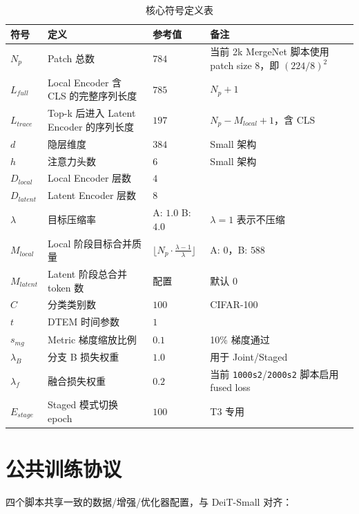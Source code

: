 \documentclass[a4paper,11pt]{article}
\begin{document}
\begin{table}[h]
\centering
\caption{核心符号定义表}
\begin{tabular}{l l l l}
\toprule
\textbf{符号} & \textbf{定义} & \textbf{参考值} & \textbf{备注} \\
\midrule
$N_p$ & Patch 总数 & $784$ & 当前 2k MergeNet 脚本使用 patch size $8$，即 $(224/8)^2$ \\
$L_{full}$ & Local Encoder 含 CLS 的完整序列长度 & $785$ & $N_p + 1$ \\
$L_{trace}$ & Top-k 后进入 Latent Encoder 的序列长度 & $197$ & $N_p - M_{local} + 1$，含 CLS \\
$d$ & 隐层维度 & $384$ & Small 架构 \\
$h$ & 注意力头数 & $6$ & Small 架构 \\
$D_{local}$ & Local Encoder 层数 & $4$ & \\
$D_{latent}$ & Latent Encoder 层数 & $8$ & \\
$\lambda$ & 目标压缩率 & \makecell[l]{A: $1.0$\\ B: $4.0$} & $\lambda=1$ 表示不压缩 \\
$M_{local}$ & Local 阶段目标合并质量 & $\lfloor N_p \cdot \frac{\lambda-1}{\lambda} \rfloor$ & A: $0$，B: $588$ \\
$M_{latent}$ & Latent 阶段总合并 token 数 & 配置 & 默认 $0$ \\
$C$ & 分类类别数 & $100$ & CIFAR-100 \\
$t$ & DTEM 时间参数 & $1$ & \\
$s_{mg}$ & Metric 梯度缩放比例 & $0.1$ & 10\% 梯度通过 \\
$\lambda_B$ & 分支 B 损失权重 & $1.0$ & 用于 Joint/Staged \\
$\lambda_f$ & 融合损失权重 & $0.2$ & 当前 \texttt{1000s2}/\texttt{2000s2} 脚本启用 fused loss \\
$E_{stage}$ & Staged 模式切换 epoch & $100$ & T3 专用 \\
\bottomrule
\end{tabular}
\end{table}

\section{公共训练协议}

四个脚本共享一致的数据/增强/优化器配置，与 DeiT-Small 对齐：
\end{document}
